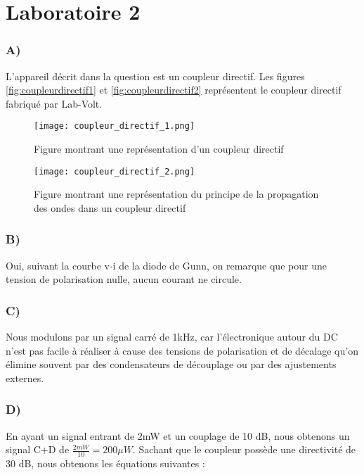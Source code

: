 



\label{s:experimentation}
\chapter{Laboratoire 2}
\subsection{A)}
L'appareil décrit dans la question est un coupleur directif. Les figures \ref{fig:coupleurdirectif1} et \ref{fig:coupleurdirectif2} représentent le coupleur directif fabriqué par Lab-Volt.
\begin{figure}
\centering
\texttt{[image: coupleur\_directif\_1.png]}
\caption{Figure montrant une représentation d'un coupleur directif}
\end{figure}
\begin{figure}
\centering
\texttt{[image: coupleur\_directif\_2.png]}
\caption{Figure montrant une représentation du principe de la propagation des ondes dans un coupleur directif}
\end{figure}

\subsection{B)}
Oui, suivant la courbe v-i de la diode de Gunn, on remarque que pour une tension de polarisation nulle, aucun courant ne circule.

\subsection{C)}
Nous modulons par un signal carré de 1kHz, car l’électronique autour du DC n’est pas facile à réaliser à cause des tensions de polarisation et de décalage qu’on élimine souvent par des condensateurs de découplage ou par des ajustements externes.

\subsection{D)}
En ayant un signal entrant de 2mW et un couplage de 10 dB, nous obtenons un signal C+D de $\frac{2mW}{10} = 200\mu W$. Sachant que le coupleur possède une directivité de 30 dB, nous obtenons les équations suivantes : 

